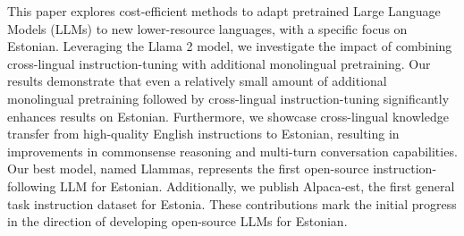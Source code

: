 This paper explores cost-efficient methods to adapt pretrained Large Language Models (LLMs) to new lower-resource languages, with a specific focus on Estonian. Leveraging the Llama 2 model, we investigate the impact of combining cross-lingual instruction-tuning with additional monolingual pretraining. Our results demonstrate that even a relatively small amount of additional monolingual pretraining followed by cross-lingual instruction-tuning significantly enhances results on Estonian. Furthermore, we showcase cross-lingual knowledge transfer from high-quality English instructions to Estonian, resulting in improvements in commonsense reasoning and multi-turn conversation capabilities. Our best model, named Llammas, represents the first open-source instruction-following LLM for Estonian. Additionally, we publish Alpaca-est, the first general task instruction dataset for Estonia. These contributions mark the initial progress in the direction of developing open-source LLMs for Estonian.